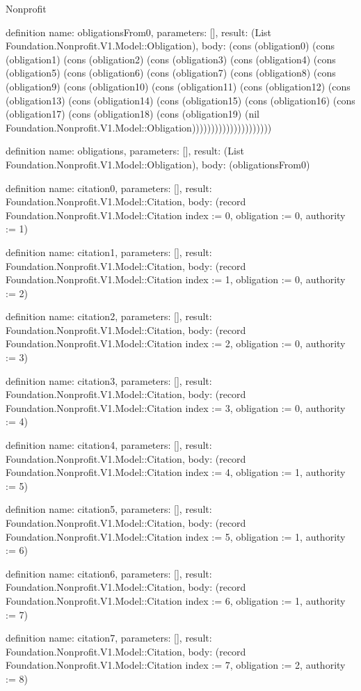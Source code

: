 \begin{lexlean}{Nonprofit}
\begin{semanticmodule}
definition{
  name: obligationsFrom0,
  parameters: [],
  result: (List Foundation.Nonprofit.V1.Model::Obligation),
  body: (cons (obligation0) (cons (obligation1) (cons (obligation2) (cons (obligation3) (cons (obligation4) (cons (obligation5) (cons (obligation6) (cons (obligation7) (cons (obligation8) (cons (obligation9) (cons (obligation10) (cons (obligation11) (cons (obligation12) (cons (obligation13) (cons (obligation14) (cons (obligation15) (cons (obligation16) (cons (obligation17) (cons (obligation18) (cons (obligation19) (nil Foundation.Nonprofit.V1.Model::Obligation)))))))))))))))))))))
}

definition{
  name: obligations,
  parameters: [],
  result: (List Foundation.Nonprofit.V1.Model::Obligation),
  body: (obligationsFrom0)
}

definition{
  name: citation0,
  parameters: [],
  result: Foundation.Nonprofit.V1.Model::Citation,
  body: (record Foundation.Nonprofit.V1.Model::Citation {index := 0, obligation := 0, authority := 1})
}

definition{
  name: citation1,
  parameters: [],
  result: Foundation.Nonprofit.V1.Model::Citation,
  body: (record Foundation.Nonprofit.V1.Model::Citation {index := 1, obligation := 0, authority := 2})
}

definition{
  name: citation2,
  parameters: [],
  result: Foundation.Nonprofit.V1.Model::Citation,
  body: (record Foundation.Nonprofit.V1.Model::Citation {index := 2, obligation := 0, authority := 3})
}

definition{
  name: citation3,
  parameters: [],
  result: Foundation.Nonprofit.V1.Model::Citation,
  body: (record Foundation.Nonprofit.V1.Model::Citation {index := 3, obligation := 0, authority := 4})
}

definition{
  name: citation4,
  parameters: [],
  result: Foundation.Nonprofit.V1.Model::Citation,
  body: (record Foundation.Nonprofit.V1.Model::Citation {index := 4, obligation := 1, authority := 5})
}

definition{
  name: citation5,
  parameters: [],
  result: Foundation.Nonprofit.V1.Model::Citation,
  body: (record Foundation.Nonprofit.V1.Model::Citation {index := 5, obligation := 1, authority := 6})
}

definition{
  name: citation6,
  parameters: [],
  result: Foundation.Nonprofit.V1.Model::Citation,
  body: (record Foundation.Nonprofit.V1.Model::Citation {index := 6, obligation := 1, authority := 7})
}

definition{
  name: citation7,
  parameters: [],
  result: Foundation.Nonprofit.V1.Model::Citation,
  body: (record Foundation.Nonprofit.V1.Model::Citation {index := 7, obligation := 2, authority := 8})
}


\end{semanticmodule}
\end{lexlean}
